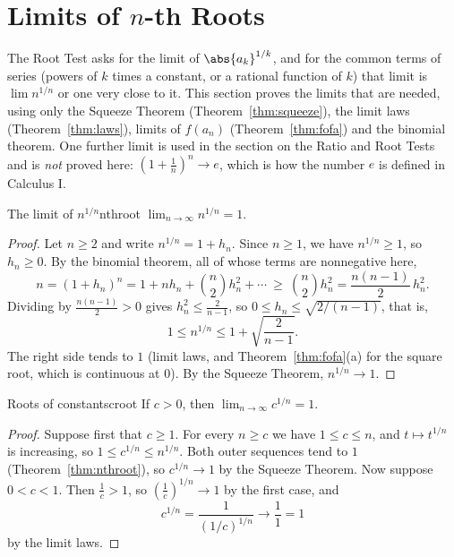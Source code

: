 \documentclass[11pt]{article}
\begin{document}
\section{Limits of $n$-th Roots}

The Root Test asks for the limit of $\abs{a_k}^{1/k}$, and for the common terms of series (powers of $k$ times a constant, or a rational function of $k$) that limit is $\lim n^{1/n}$ or one very close to it. This section proves the limits that are needed, using only the Squeeze Theorem (Theorem~\ref{thm:squeeze}), the limit laws (Theorem~\ref{thm:laws}), limits of $f(a_n)$ (Theorem~\ref{thm:fofa}) and the binomial theorem. One further limit is used in the section on the Ratio and Root Tests and is \emph{not} proved here: $\left(1+\frac1n\right)^n\to e$, which is how the number $e$ is defined in Calculus I.

\begin{thm}{The limit of $n^{1/n}$}{nthroot}
$\displaystyle\lim_{n\to\infty}n^{1/n}=1$.
\end{thm}
\begin{proof}
Let $n\ge2$ and write $n^{1/n}=1+h_n$. Since $n\ge1$, we have $n^{1/n}\ge1$, so $h_n\ge0$. By the binomial theorem, all of whose terms are nonnegative here,
\[
n=(1+h_n)^n=1+nh_n+\binom n2h_n^2+\cdots\ \ge\ \binom n2h_n^2=\frac{n(n-1)}2\,h_n^2 .
\]
Dividing by $\frac{n(n-1)}2>0$ gives $h_n^2\le\frac2{n-1}$, so $0\le h_n\le\sqrt{2/(n-1)}$, that is,
\[
1\le n^{1/n}\le1+\sqrt{\frac2{n-1}} .
\]
The right side tends to $1$ (limit laws, and Theorem~\ref{thm:fofa}(a) for the square root, which is continuous at $0$). By the Squeeze Theorem, $n^{1/n}\to1$.
\end{proof}

\begin{thm}{Roots of constants}{croot}
If $c>0$, then $\displaystyle\lim_{n\to\infty}c^{1/n}=1$.
\end{thm}
\begin{proof}
Suppose first that $c\ge1$. For every $n\ge c$ we have $1\le c\le n$, and $t\mapsto t^{1/n}$ is increasing, so $1\le c^{1/n}\le n^{1/n}$. Both outer sequences tend to $1$ (Theorem~\ref{thm:nthroot}), so $c^{1/n}\to1$ by the Squeeze Theorem. Now suppose $0<c<1$. Then $\frac1c>1$, so $\left(\frac1c\right)^{1/n}\to1$ by the first case, and
\[
c^{1/n}=\frac1{(1/c)^{1/n}}\to\frac11=1
\]
by the limit laws.
\end{proof}
\end{document}
